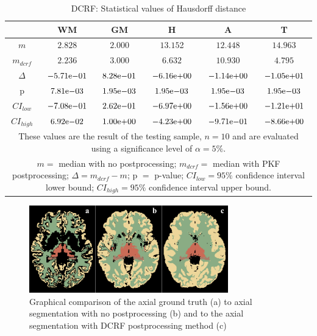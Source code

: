 \documentclass[journal]{IEEEtran}
\begin{document}
\begin{table}[h!]

\renewcommand{\arraystretch}{1.3}
\caption{DCRF: Statistical values of Hausdorff distance}
\label{tbl_dcrf_hd}
\centering
\tabcolsep=0.08cm
\begin{tabular}{c|c|c|c|c|c}
\hline
 & WM & GM & H & A & T\\
\hline
$m$&$2.828$&$2.000$&$13.15$2&$12.44$8&$14.963$\\
$m_{dcrf}$&$2.236$&$3.000$&$6.632$&$10.93$0&$4.795$\\
$\Delta$&${-5.71}\mathrm{e}{-01}$&${8.28}\mathrm{e}{-01}$&${-6.16}\mathrm{e}{+00}$&${-1.14}\mathrm{e}{+00}$&${-1.05}\mathrm{e}{+01}$\\
p&${7.81}\mathrm{e}{-03}$&${1.95}\mathrm{e}{-03}$&${1.95}\mathrm{e}{-03}$&${1.95}\mathrm{e}{-03}$&${1.95}\mathrm{e}{-03}$\\
$CI_{low}$&${-7.08}\mathrm{e}{-01}$&${2.62}\mathrm{e}{-01}$&${-6.97}\mathrm{e}{+00}$&${-1.56}\mathrm{e}{+00}$&${-1.21}\mathrm{e}{+01}$\\
$CI_{high}$	&${6.92}\mathrm{e}{-02}$&${1.00}\mathrm{e}{+00}$&${-4.23}\mathrm{e}{+00}$&${-9.71}\mathrm{e}{-01}$&${-8.66}\mathrm{e}{+00}$\\
\hline
\multicolumn{6}{p{3.4in}}{These values are the result of the testing sample, $n=10$ and are evaluated using a significance level of $\alpha = 5\%$. }\\
\multicolumn{6}{p{3.4in}}{$m=$ median with no postprocessing; $m_{dcrf}=$ median with PKF postprocessing; $\Delta=m_{dcrf}-m$; p $=$ p-value;  $CI_{low}= 95\%$ confidence interval lower bound; $CI_{high}= 95\%$ confidence interval upper bound.}\\

\end{tabular}

\end{table}

\begin{figure}[ht]
\centering
\includegraphics[width=3.4in]{MIALab_Report/img/boxplots/DCRF.png}
\caption{Graphical comparison of the axial ground truth (a) to axial segmentation with no postprocessing (b) and to the axial segmentation with DCRF postprocessing method (c) }
\label{fig_dcrf}
\end{figure}
\end{document}
